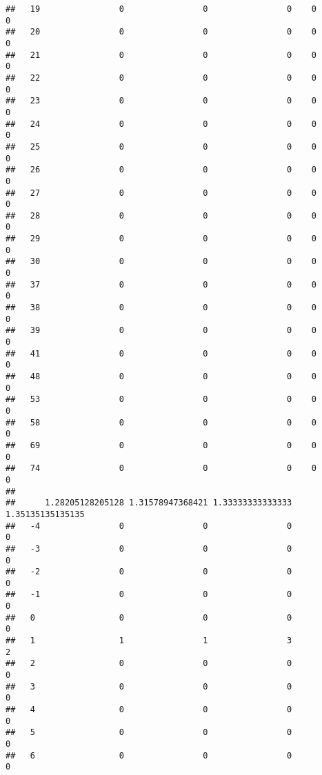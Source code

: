 \documentclass[]{article}
\begin{document}
\begin{verbatim}
##   19                0                0                0    0                0
##   20                0                0                0    0                0
##   21                0                0                0    0                0
##   22                0                0                0    0                0
##   23                0                0                0    0                0
##   24                0                0                0    0                0
##   25                0                0                0    0                0
##   26                0                0                0    0                0
##   27                0                0                0    0                0
##   28                0                0                0    0                0
##   29                0                0                0    0                0
##   30                0                0                0    0                0
##   37                0                0                0    0                0
##   38                0                0                0    0                0
##   39                0                0                0    0                0
##   41                0                0                0    0                0
##   48                0                0                0    0                0
##   53                0                0                0    0                0
##   58                0                0                0    0                0
##   69                0                0                0    0                0
##   74                0                0                0    0                0
##     
##      1.28205128205128 1.31578947368421 1.33333333333333 1.35135135135135
##   -4                0                0                0                0
##   -3                0                0                0                0
##   -2                0                0                0                0
##   -1                0                0                0                0
##   0                 0                0                0                0
##   1                 1                1                3                2
##   2                 0                0                0                0
##   3                 0                0                0                0
##   4                 0                0                0                0
##   5                 0                0                0                0
##   6                 0                0                0                0

\end{verbatim}
\end{document}
